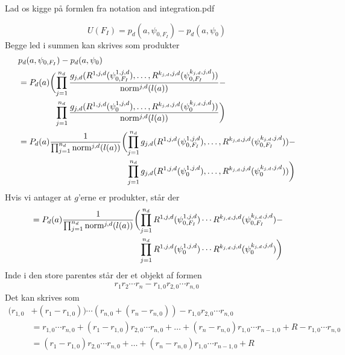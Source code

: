 \documentclass[a4paper, 12pt]{memoir}
\begin{document}
Lad os kigge på formlen fra notation and integration.pdf

\begin{equation}
U(F_I)=p_d(a,\psi_{0,F_I})-p_d(a, \psi_0)
\end{equation}
Begge led i summen kan skrives som produkter
\begin{align}
&p_d(a,\psi_{0,F_I})-p_d(a, \psi_0)\\
&=P_d(a) \biggl(\begin{lgathered}[t]\prod_{j=1}^{n_d} \frac{g_{j,d}(R^{1,j,d}(\psi_{0,F_I}^{1,j,d}),  \dots , R^{k_{j,d},j,d}(\psi_{0,F_I}^{k_{j,d},j,d}) )}{\textup{norm}^{j,d}(l(a))}-\\
 \prod_{j=1}^{n_d} \frac{g_{j,d}(R^{1,j,d}(\psi_{0}^{1,j,d}),  \dots , R^{k_{j,d},j,d}(\psi_{0}^{k_{j,d},j,d}) )}{\textup{norm}^{j,d}(l(a))}\biggr)\end{lgathered}\\
 &=P_d(a) \frac{1}{\prod_{j=1}^{n_d}{\textup{norm}^{j,d}(l(a))}}\biggl(\begin{lgathered}[t]\prod_{j=1}^{n_d} {g_{j,d}(R^{1,j,d}(\psi_{0,F_I}^{1,j,d}),  \dots , R^{k_{j,d},j,d}(\psi_{0,F_I}^{k_{j,d},j,d}) )}-\\
 \prod_{j=1}^{n_d} {g_{j,d}(R^{1,j,d}(\psi_{0}^{1,j,d}),  \dots , R^{k_{j,d},j,d}(\psi_{0}^{k_{j,d},j,d}) )}\biggr)\end{lgathered}\\
\end{align}
Hvis vi antager at $g$'erne er produkter, står der
\begin{align}
 &=P_d(a) \frac{1}{\prod_{j=1}^{n_d}{\textup{norm}^{j,d}(l(a))}}\biggl(\begin{lgathered}[t]\prod_{j=1}^{n_d} {R^{1,j,d}(\psi_{0,F_I}^{1,j,d})  \cdots R^{k_{j,d},j,d}(\psi_{0,F_I}^{k_{j,d},j,d}) }-\\
 \prod_{j=1}^{n_d} {R^{1,j,d}(\psi_{0}^{1,j,d}) \cdots R^{k_{j,d},j,d}(\psi_{0}^{k_{j,d},j,d}) }\biggr)\end{lgathered}\\
\end{align}
Inde i den store parentes står der et objekt af formen
\begin{align}
r_1r_2\cdots r_n- r_{1,0}r_{2,0}\cdots r_{n,0}
\end{align}
Det kan skrives som
\begin{align}
(r_{1,0}&+(r_1-r_{1,0}))\cdots (r_{n,0}+(r_n-r_{n,0}))- r_{1,0}r_{2,0}\cdots r_{n,0}\\
&=r_{1,0}\cdots r_{n,0}+(r_1-r_{1,0})r_{2,0}\cdots r_{n,0}+\dots + (r_n-r_{n,0})r_{1,0}\cdots r_{n-1,0}+ R -r_{1,0}\cdots r_{n,0}\\
&=(r_1-r_{1,0})r_{2,0}\cdots r_{n,0}+\dots + (r_n-r_{n,0})r_{1,0}\cdots r_{n-1,0}+ R
\end{align}
\end{document}
